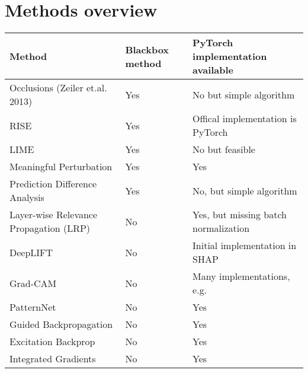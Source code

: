 \section{Methods overview}

\begin{tabular}{| p{7cm} | p{2.5cm} | p{6cm} | }
\hline
\textbf{Method} & \textbf{Blackbox method} & \textbf{PyTorch implementation available} \\ \hline
Occlusions (Zeiler et.al. 2013) \cite{zeiler2014visualizing} & Yes & No but simple algorithm \\ \hline
RISE \cite{Petsiuk2018rise} & Yes & Offical implementation is PyTorch \\ \hline
LIME \cite{ribeiro2016should} & Yes & No but feasible \\ \hline
Meaningful Perturbation \cite{fong2017interpretable} & Yes & Yes \cite{fong2017implementation} \\ \hline
Prediction Difference Analysis \cite{zintgraf2017visualizing} & Yes & No, but simple algorithm \\ \hline
Layer-wise Relevance Propagation (LRP) \cite{bach2015pixel} & No & Yes, but missing batch normalization \cite{lrppytorch} \\ \hline
DeepLIFT \cite{shrikumar2017learning} & No & Initial implementation in SHAP \cite{NIPS2017_7062} \\ \hline
Grad-CAM \cite{selvaraju2017grad} & No & Many implementations, e.g. \cite{visualattribution} \\ \hline
PatternNet \cite{kindermans2017learning} & No & Yes \cite{visualattribution} \\ \hline
Guided Backpropagation \cite{springenberg2014striving}  & No & Yes \cite{visualattribution} \\ \hline
Excitation Backprop \cite{zhang2016EB} & No & Yes \cite{visualattribution} \\ \hline
Integrated Gradients \cite{sundararajan2017axiomatic} & No & Yes \cite{integratedgradientpytorch}  \\ \hline
\end{tabular}
